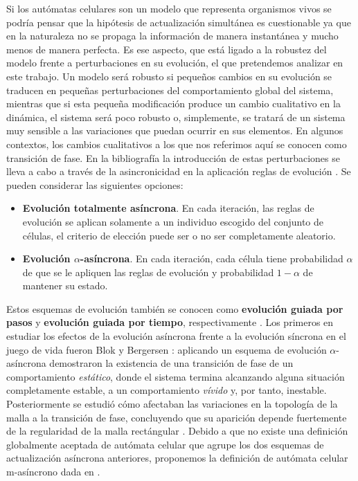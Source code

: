 \documentclass[../proyecto.tex]{book}
\begin{document}
Si los autómatas celulares son un modelo que representa organismos vivos se podría pensar que la hipótesis de actualización simultánea es cuestionable ya que en la naturaleza no se propaga la información de manera instantánea y mucho menos de manera perfecta. Es ese aspecto, que está ligado a la robustez del modelo frente a perturbaciones en su evolución, el que pretendemos analizar en este trabajo. Un modelo será robusto si pequeños cambios en su evolución se traducen en pequeñas perturbaciones del comportamiento global del sistema, mientras que si esta pequeña modificación produce un cambio cualitativo en la dinámica, el sistema será poco robusto o, simplemente, se tratará de un sistema muy sensible a las variaciones que puedan ocurrir en sus elementos. En algunos contextos, los cambios cualitativos a los que nos referimos aquí se conocen como transición de fase. En la bibliografía la introducción de estas perturbaciones se lleva a cabo a través de la asincronicidad en la aplicación reglas de evolución \cite{asyncIntro}. Se pueden considerar las siguientes opciones:
\begin{itemize}
	\item \textbf{Evolución totalmente asíncrona}. En cada iteración, las reglas de evolución se aplican solamente a un individuo escogido del conjunto de células, el criterio de elección puede ser o no ser completamente aleatorio.
	\item \textbf{Evolución $\alpha$-asíncrona}. En cada iteración, cada célula tiene probabilidad $\alpha$ de que se le apliquen las reglas de evolución y probabilidad $1-\alpha$ de mantener su estado.
\end{itemize}

Estos esquemas de evolución también se conocen como \textbf{evolución guiada por pasos} y \textbf{evolución guiada por tiempo}, respectivamente \cite{aka}. Los primeros en estudiar los efectos de la evolución asíncrona frente a la evolución síncrona en el juego de vida fueron Blok y Bergersen \cite{syncVSasync}: aplicando un esquema de evolución $\alpha$-asíncrona demostraron la existencia de una transición de fase de un comportamiento \textit{estático}, donde el sistema termina alcanzando alguna situación completamente estable, a un comportamiento \textit{vívido} y, por tanto, inestable. Posteriormente se estudió cómo afectaban las variaciones en la topología de la malla a la transición de fase, concluyendo que su aparición depende fuertemente de la regularidad de la malla rectángular \cite{mallaIrregular}. Debido a que no existe una definición globalmente aceptada de autómata celular que agrupe los dos esquemas de actualización asíncrona anteriores, proponemos la definición de autómata celular m-asíncrono dada en \cite{oraculo}. 
\end{document}
